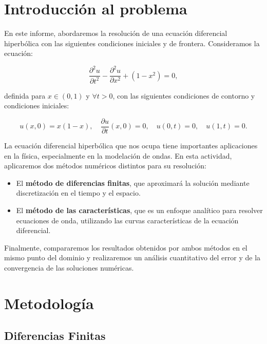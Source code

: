 \chapter{Introducción al problema}

En este informe, abordaremos la resolución de una ecuación diferencial hiperbólica con las siguientes condiciones iniciales y de frontera. Consideramos la ecuación:

\begin{equation}\label{eq:onda}
    \frac{\partial^2 u}{\partial t^2} - \frac{\partial^2 u}{\partial x^2} + (1 - x^2) = 0,
\end{equation}

definida para $x \in (0, 1)$ y $\forall t > 0$, con las siguientes condiciones de contorno y condiciones iniciales:

\begin{equation}\label{eq:condiciones}
    u(x, 0) = x(1 - x), \quad \frac{\partial u}{\partial t}(x, 0) = 0, \quad u(0, t) = 0, \quad u(1, t) = 0.
\end{equation}

La ecuación diferencial hiperbólica que nos ocupa tiene importantes aplicaciones en la física, especialmente en la modelación de ondas. En esta actividad, aplicaremos dos métodos numéricos distintos para su resolución:

\begin{itemize}
    \item El \textbf{método de diferencias finitas}, que aproximará la solución mediante discretización en el tiempo y el espacio.
    \item El \textbf{método de las características}, que es un enfoque analítico para resolver ecuaciones de onda, utilizando las curvas características de la ecuación diferencial.
\end{itemize}

Finalmente, compararemos los resultados obtenidos por ambos métodos en el mismo punto del dominio y realizaremos un análisis cuantitativo del error y de la convergencia de las soluciones numéricas.

\chapter{Metodología}

\section{Diferencias Finitas}

